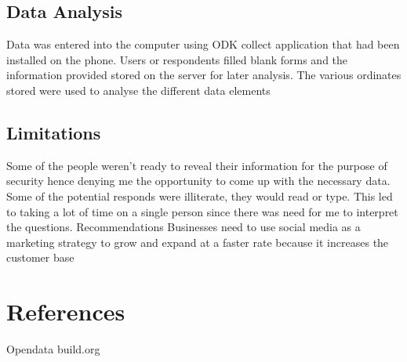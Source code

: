 \documentclass[12pt]{article}
\begin{document}
\subsection{Data Analysis }
Data was entered into the computer using ODK collect application that had been installed on the phone. Users or respondents filled blank forms and the information provided stored on the server for later analysis.
 The various ordinates stored were used to analyse the different data elements

\subsection{Limitations }
Some of the people weren’t ready to reveal their information for the purpose of security hence denying me the opportunity to come up with the necessary data.
Some of the potential responds were illiterate, they would read or type. This led to taking a lot of time on a single person since there was need for me to interpret the questions.
Recommendations
Businesses need to use social media as a marketing strategy to grow and expand at a faster rate because it increases the customer base

\section{References}
Opendata build.org
\end{document}

